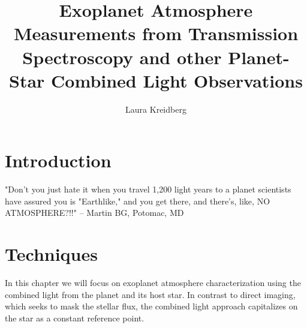 \documentclass[graybox,natbib,nosecnum]{svmult}
\begin{document}
\title*{Exoplanet Atmosphere Measurements from Transmission Spectroscopy and other Planet-Star Combined Light Observations}
\author{Laura Kreidberg}
%
%
\maketitle




\section{Introduction }
"Don't you just hate it when you travel 1,200 light years to a planet scientists have assured you is "Earthlike," and you get there, and there's, like, NO ATMOSPHERE?!!" -- Martin BG, Potomac, MD



\section{Techniques} 
In this chapter we will focus on exoplanet atmosphere characterization using the combined light from the planet and its host star. In contrast to direct imaging, which seeks to mask the stellar flux, the combined light approach capitalizes on the star as a constant reference point. 
\end{document}
